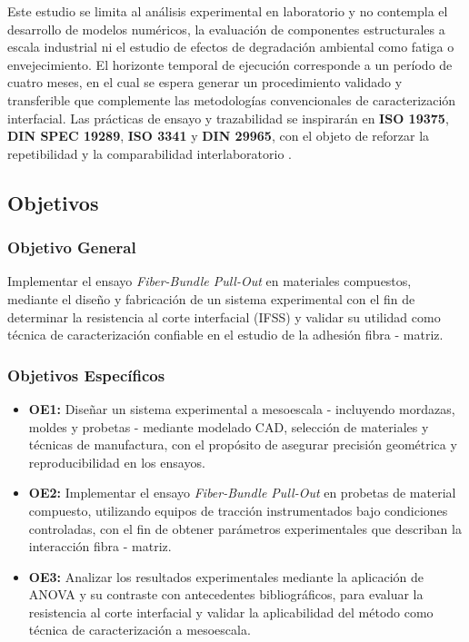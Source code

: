 Este estudio se limita al análisis experimental en laboratorio y no contempla el desarrollo
de modelos numéricos, la evaluación de componentes estructurales a escala industrial ni
el estudio de efectos de degradación ambiental como fatiga o envejecimiento. El horizonte
temporal de ejecución corresponde a un período de cuatro meses, en el cual se espera generar
un procedimiento validado y transferible que complemente las metodologías convencionales
de caracterización interfacial. Las prácticas de ensayo y trazabilidad se inspirarán en \textbf{ISO 19375},
\textbf{DIN SPEC 19289}, \textbf{ISO 3341} y \textbf{DIN 29965}, con el objeto de reforzar la repetibilidad y
la comparabilidad interlaboratorio \cite{ISO19375,DINSPEC19289,ISO3341,DIN29965}.

\subsection{Objetivos}

\subsubsection{Objetivo General}
Implementar el ensayo \textit{Fiber-Bundle Pull-Out} en materiales compuestos, mediante el diseño
y fabricación de un sistema experimental con el fin de determinar la resistencia al corte
interfacial (IFSS) y validar su utilidad como técnica de caracterización confiable en el estudio
de la adhesión fibra - matriz.

\subsubsection{Objetivos Específicos}
\begin{itemize}
    \item \textbf{OE1:} Diseñar un sistema experimental a mesoescala - incluyendo mordazas, moldes
    y probetas - mediante modelado CAD, selección de materiales y técnicas de manufactura,
    con el propósito de asegurar precisión geométrica y reproducibilidad en los ensayos.
    \item \textbf{OE2:} Implementar el ensayo \textit{Fiber-Bundle Pull-Out} en probetas de
    material compuesto, utilizando equipos de tracción instrumentados bajo condiciones controladas,
    con el fin de obtener parámetros experimentales que describan la interacción fibra -
    matriz.
    \item \textbf{OE3:} Analizar los resultados experimentales mediante la aplicación de ANOVA y su
    contraste con antecedentes bibliográficos, para evaluar la resistencia al corte interfacial
    y validar la aplicabilidad del método como técnica de caracterización a mesoescala.
\end{itemize}


